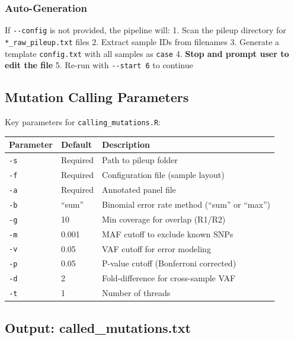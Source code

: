 \documentclass[
]{article}
\newcounter{none} %
\begin{document}
\subsubsection{Auto-Generation}\label{auto-generation}

If \texttt{-\/-config} is not provided, the pipeline will: 1. Scan the
pileup directory for \texttt{*\_raw\_pileup.txt} files 2. Extract sample
IDs from filenames 3. Generate a template \texttt{config.txt} with all
samples as \texttt{case} 4. \textbf{Stop and prompt user to edit the
file} 5. Re-run with \texttt{-\/-start\ 6} to continue

\subsection{Mutation Calling
Parameters}\label{mutation-calling-parameters}

Key parameters for \texttt{calling\_mutations.R}:

{\def\LTcaptype{none} %
\begin{longtable}[]{@{}lll@{}}
\toprule\noalign{}
Parameter & Default & Description \\
\midrule\noalign{}
\endhead
\bottomrule\noalign{}
\endlastfoot
\texttt{-s} & Required & Path to pileup folder \\
\texttt{-f} & Required & Configuration file (sample layout) \\
\texttt{-a} & Required & Annotated panel file \\
\texttt{-b} & ``sum'' & Binomial error rate method (``sum'' or
``max'') \\
\texttt{-g} & 10 & Min coverage for overlap (R1/R2) \\
\texttt{-m} & 0.001 & MAF cutoff to exclude known SNPs \\
\texttt{-v} & 0.05 & VAF cutoff for error modeling \\
\texttt{-p} & 0.05 & P-value cutoff (Bonferroni corrected) \\
\texttt{-d} & 2 & Fold-difference for cross-sample VAF \\
\texttt{-t} & 1 & Number of threads \\
\end{longtable}
}

\subsection{Output:
called\_mutations.txt}\label{output-called_mutations.txt}
\end{document}
